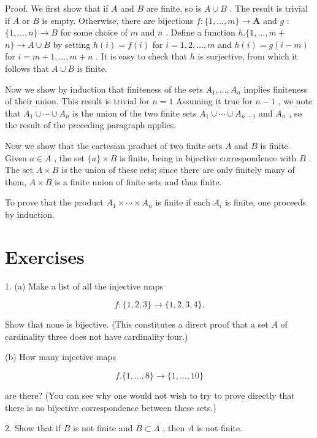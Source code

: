Proof. We first show that if \(A\) and \(B\) are finite, so is \(A \cup  B\) . The result is trivial if \(A\) or \(B\) is empty. Otherwise, there are bijections \(f : \{ 1,\ldots ,m\}  \rightarrow  \mathbf{A}\) and \(g\) : \(\{ 1,\ldots ,n\}  \rightarrow  B\) for some choice of \(m\) and \(n\) . Define a function \(h.\{ 1,\ldots ,m +\)  \(n\}  \rightarrow  A \cup  B\) by setting \(h\left( i\right)  = f\left( i\right)\) for \(i = 1,2,\ldots ,m\) and \(h\left( i\right)  = g\left( {i - m}\right)\) for \(i = m + 1,\ldots ,m + n\) . It is easy to check that \(h\) is surjective, from which it follows that \(A \cup  B\) is finite.

Now we show by induction that finiteness of the sets \({A}_{1},\ldots ,{A}_{n}\) implies finiteness of their union. This result is trivial for \(n = 1\) Assuming it true for \(n - 1\) , we note that \({A}_{1} \cup  \cdots  \cup  {A}_{n}\) is the union of the two finite sets \({A}_{1} \cup  \cdots  \cup  {A}_{n - 1}\) and \({A}_{n}\) , so the result of the preceding paragraph applies.

Now we show that the cartesian product of two finite sets \(A\) and \(B\) is finite. Given \(a \in  A\) , the set \(\{ a\}  \times  B\) is finite, being in bijective correspondence with \(B\) . The set \(A \times  B\) is the union of these sets; since there are only finitely many of them, \(A \times  B\) is a finite union of finite sets and thus finite.

To prove that the product \({A}_{1} \times  \cdots  \times  {A}_{n}\) is finite if each \({A}_{i}\) is finite, one proceeds by induction.

\section*{Exercises}

1. (a) Make a list of all the injective maps

\[
f : \{ 1,2,3\}  \rightarrow  \{ 1,2,3,4\} .
\]

Show that none is bijective. (This constitutes a direct proof that a set \(A\) of cardinality three does not have cardinality four.)

(b) How many injective maps

\[
f.\{ 1,\ldots ,8\}  \rightarrow  \{ 1,\ldots ,{10}\}
\]

are there? (You can see why one would not wish to try to prove directly that there is no bijective correspondence between these sets.)

2. Show that if \(B\) is not finite and \(B \subset  A\) , then \(A\) is not finite.

